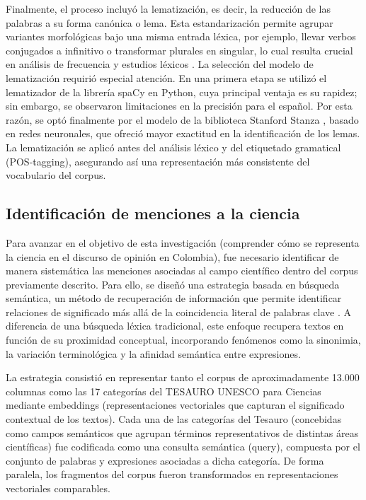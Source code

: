 \documentclass[11pt,a4paper]{article}
\begin{document}
	
		Finalmente, el proceso incluyó la lematización, es decir, la reducción de las palabras a su forma canónica o lema. Esta estandarización permite agrupar variantes morfológicas bajo una misma entrada léxica, por ejemplo, llevar verbos conjugados a infinitivo o transformar plurales en singular, lo cual resulta crucial en análisis de frecuencia y estudios léxicos \cite{Orellana2018}. La selección del modelo de lematización requirió especial atención. En una primera etapa se utilizó el lematizador de la librería spaCy en Python, cuya principal ventaja es su rapidez; sin embargo, se observaron limitaciones en la precisión para el español. Por esta razón, se optó finalmente por el modelo de la biblioteca Stanford Stanza \cite{qi2020stanza}, basado en redes neuronales, que ofreció mayor exactitud en la identificación de los lemas. La lematización se aplicó antes del análisis léxico y del etiquetado gramatical (POS-tagging), asegurando así una representación más consistente del vocabulario del corpus.

	
	\subsection{Identificación de menciones a la ciencia}
	
	
Para avanzar en el objetivo de esta investigación (comprender cómo se representa la ciencia en el discurso de opinión en Colombia), fue necesario identificar de manera sistemática las menciones asociadas al campo científico dentro del corpus previamente descrito. Para ello, se diseñó una estrategia basada en búsqueda semántica, un método de recuperación de información que permite identificar relaciones de significado más allá de la coincidencia literal de palabras clave \cite{Wei2022}. A diferencia de una búsqueda léxica tradicional, este enfoque recupera textos en función de su proximidad conceptual, incorporando fenómenos como la sinonimia, la variación terminológica y la afinidad semántica entre expresiones.

La estrategia consistió en representar tanto el corpus de aproximadamente 13.000 columnas como las 17 categorías del TESAURO UNESCO para Ciencias mediante embeddings (representaciones vectoriales que capturan el significado contextual de los textos). Cada una de las categorías del Tesauro (concebidas como campos semánticos que agrupan términos representativos de distintas áreas científicas) fue codificada como una consulta semántica (query), compuesta por el conjunto de palabras y expresiones asociadas a dicha categoría. De forma paralela, los fragmentos del corpus fueron transformados en representaciones vectoriales comparables.
	
\end{document}
